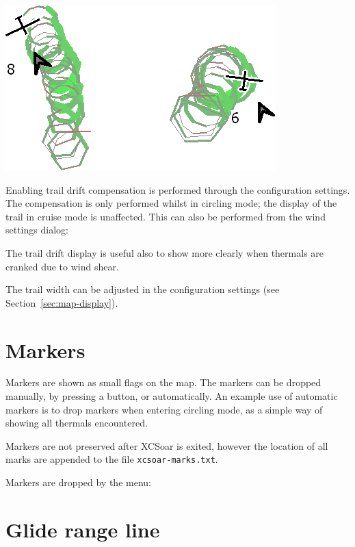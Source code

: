 \documentclass[a4paper,12pt]{refrep}
\begin{document}
\begin{center}
\includegraphics[angle=0,width=0.8\linewidth,keepaspectratio='true']{figures/traildrift.png}
\end{center}

Enabling trail drift compensation is performed through the
configuration settings.  The compensation is only performed whilst in
circling mode; the display of the trail in cruise mode is unaffected.
This can also be performed from the wind settings dialog:
\begin{quote}
\blink{}
\end{quote}

The trail drift display is useful also to show more clearly when thermals
are cranked due to wind shear.

The trail width can be adjusted in the configuration settings (see
Section~\ref{sec:map-display}).

\section{Markers}

Markers are shown as small flags on the map.  The markers can be dropped
manually, by pressing a button, or automatically.  An example use of
automatic markers is to drop markers when entering circling mode, as a
simple way of showing all thermals encountered.

Markers are not preserved after XCSoar is exited, however the location
of all marks are appended to the file \verb|xcsoar-marks.txt|.

Markers are dropped by the menu: 
\begin{quote}
\blink{}
\end{quote}

\section{Glide range line}
\end{document}
